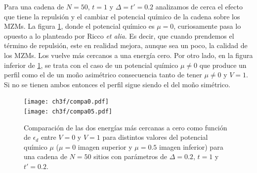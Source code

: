 Para una cadena de $N=50$, $t=1$ y $\Delta=t'=0.2$ analizamos de cerca el efecto que tiene la repulsi\'{o}n y el cambiar el potencial qu\'{i}mico de la cadena sobre los MZMs. La figura \ref{comparacion2}, donde el potencial qu\'{i}mico es $\mu=0$, curiosamente pasa lo opuesto a lo planteado por Ricco \emph{et alia}. Es decir, que cuando prendemos el t\'{e}rmino de repulsi\'{o}n, este en realidad mejora, aunque sea un poco, la calidad de los MZMs. Los vuelve m\'{a}s cercanos a una energ\'{i}a cero. Por otro lado, en la figura inferior de \ref{comparacion2}, se trata con el caso de un potencial qu\'{i}mico $\mu\neq 0$ que produce un perfil como el de un mo\~{n}o asim\'{e}trico consecuencia tanto de tener $\mu\neq 0$ y $V=1$. Si no se tienen ambos entonces el perfil sigue siendo el del mo\~{n}o sim\'{e}trico.
%
% 
\begin{figure}[H]
\begin{center}
\texttt{[image: ch3f/compa0.pdf]}\\
\vspace{-0.3cm}
\texttt{[image: ch3f/compa05.pdf]}
\end{center}
\caption{Comparaci\'{o}n de las dos energ\'{i}as m\'{a}s cercanas a cero como funci\'{o}n de $\epsilon_d$ entre $V=0$ y $V=1$ para distintos valores del potencial qu\'{i}mico $\mu$ ($\mu=0$ imagen superior y $\mu=0.5$ imagen inferior) para una cadena de $N=50$ sitios con par\'{a}metros de $\Delta=0.2$, $t=1$ y $t'=0.2$.}
\label{comparacion2}
\end{figure}

